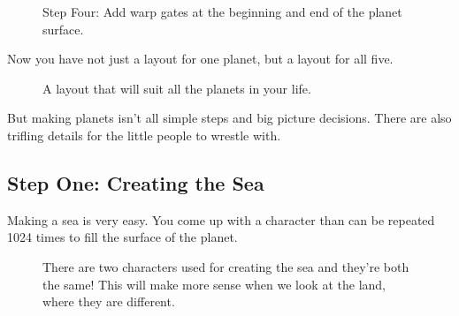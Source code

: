 \begin{figure}[H]
  {
    \begin{adjustbox}{width=10cm,center}
    \end{adjustbox}
  }\caption[]{Step Four: Add warp gates at the beginning and end of the planet surface.}
\end{figure}

Now you have not just a layout for one planet, but a layout for all five.

\begin{figure}[H]
  {
      \begin{subfigure}{0.4\textwidth}
      \end{subfigure}
      \begin{subfigure}{0.4\textwidth}
      \end{subfigure}
      \begin{subfigure}{0.4\textwidth}
      \end{subfigure}
      \hspace{2.75cm}
      \begin{subfigure}{0.4\textwidth}
      \end{subfigure}
  }\caption[]{A layout that will suit all the planets in your life.}
\end{figure}

But making planets isn't all simple steps and big picture decisions. There are also
trifling details for the little people to wrestle with.

\subsection{Step One: Creating the Sea}

Making a sea is very easy. You come up with a character than can be repeated 1024 times to fill the
surface of the planet.

\begin{figure}[H]
{
  \setlength{\tabcolsep}{3.0pt}
  \setlength\cmidrulewidth{\heavyrulewidth} %
    \begin{adjustbox}{width=10cm,center}
  \begin{subfigure}{0.3\textwidth}
  
  \end{subfigure}
  \begin{subfigure}{0.3\textwidth}
  
  \end{subfigure}
  \end{adjustbox}
}\caption[]{There are two characters used for creating the sea and they're both the same! This will make more sense when
we look at the land, where they are different.}
\end{figure}


